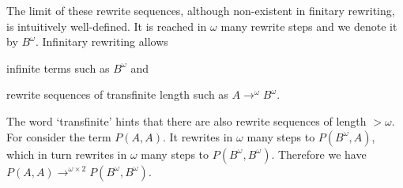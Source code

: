 The limit of these rewrite sequences, although non-existent in
finitary rewriting, is intuitively well-defined. It is reached in
$\omega$ many rewrite steps and we denote it by $B^\omega$. Infinitary
rewriting allows \begin{inparaenum}[(i)]
  \item infinite terms such as $B^\omega$ and
  \item rewrite sequences of transfinite length such as $A
    \rightarrow^\omega B^\omega$.
\end{inparaenum}\nopagebreak[3]
\begin{center}
{\footnotesize{}}
\end{center}\vspace{-0.8\baselineskip}
The word `transfinite' hints that there are also rewrite sequences of
length $> \omega$. For consider the term $P(A, A)$. It rewrites in
$\omega$ many steps to $P(B^\omega, A)$, which in turn rewrites in
$\omega$ many steps to $P(B^\omega, B^\omega)$. Therefore we have
$P(A, A) \rightarrow^{\omega \times 2} P(B^\omega, B^\omega)$.
